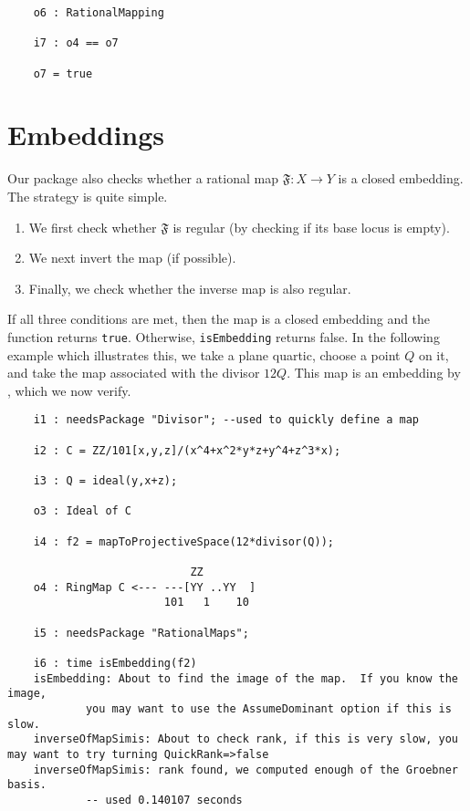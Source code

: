 \documentclass[11pt]{amsart}%
\numberwithin{equation}{theorem}
\renewcommand{\:}{\colon}
\theoremstyle{theorem}
\begin{document}
{{\begin{verbatim}
    o6 : RationalMapping

    i7 : o4 == o7

    o7 = true
\end{verbatim}
}
{\color{black}\normalsize
\section{Embeddings}

Our package also checks whether a rational map $\mathfrak{F} : X \to Y$ is a closed embedding.  The strategy is quite simple.
\begin{enumerate}
\item  We first check whether $\mathfrak{F}$ is regular (by checking if its base locus is empty).
\item  We next invert the map (if possible).
\item  Finally, we check whether the inverse map is also regular.
\end{enumerate}
If all three conditions are met, then the map is a closed embedding and the function returns {\tt true}.  Otherwise, {\tt isEmbedding} returns false.
In the following example which illustrates this, we take a plane quartic, choose a point $Q$ on it, and take the map associated with the divisor $12 Q$.  This map is an embedding by \cite[Chapter IV, Corollary 3.2]{Hartshorne}, which we now verify.
}
{\scriptsize
\color{blue}\begin{verbatim}
    i1 : needsPackage "Divisor"; --used to quickly define a map                                           

    i2 : C = ZZ/101[x,y,z]/(x^4+x^2*y*z+y^4+z^3*x);

    i3 : Q = ideal(y,x+z);

    o3 : Ideal of C

    i4 : f2 = mapToProjectiveSpace(12*divisor(Q));

                            ZZ
    o4 : RingMap C <--- ---[YY ..YY  ]                                                                    
                        101   1    10

    i5 : needsPackage "RationalMaps";

    i6 : time isEmbedding(f2)    
    isEmbedding: About to find the image of the map.  If you know the image,
            you may want to use the AssumeDominant option if this is slow.
    inverseOfMapSimis: About to check rank, if this is very slow, you may want to try turning QuickRank=>false
    inverseOfMapSimis: rank found, we computed enough of the Groebner basis.
            -- used 0.140107 seconds                                                                         


\end{verbatim}}}
\end{document}
